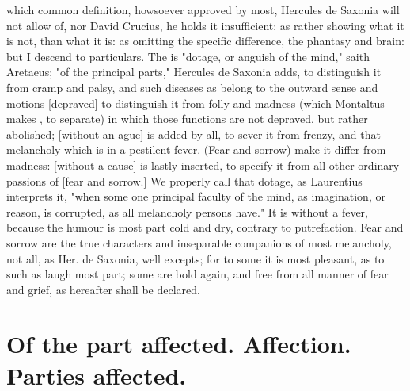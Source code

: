  \etc{} which common
definition, howsoever approved by most, Hercules de
Saxonia will not allow of, nor David Crucius,  he holds it insufficient: as
rather showing what it is not, than what it is: as
omitting the specific difference, the phantasy and brain: but I descend to
particulars. The  is "dotage, or anguish of the mind," saith
Aretaeus; "of the principal parts," Hercules de Saxonia adds, to distinguish it
from cramp and palsy, and such diseases as belong to the outward sense and
motions [depraved] to distinguish it from folly and
madness (which Montaltus makes , to separate) in which those
functions are not depraved, but rather abolished; [without an ague] is added by
all, to sever it from frenzy, and that melancholy which is in a pestilent
fever. (Fear and sorrow) make it differ from madness: [without a cause] is
lastly inserted, to specify it from all other ordinary passions of [fear and
sorrow.] We properly call that dotage, as Laurentius
interprets it, "when some one principal faculty of the mind, as imagination, or
reason, is corrupted, as all melancholy persons have." It is without a fever,
because the humour is most part cold and dry, contrary to putrefaction. Fear
and sorrow are the true characters and inseparable companions of most
melancholy, not all, as Her. de Saxonia,  well excepts; for to some it is most
pleasant, as to such as laugh most part; some are bold again, and free from all
manner of fear and grief, as hereafter shall be declared.

\section{Of the part affected. Affection. Parties affected.}\label{sec:parts-affected}

